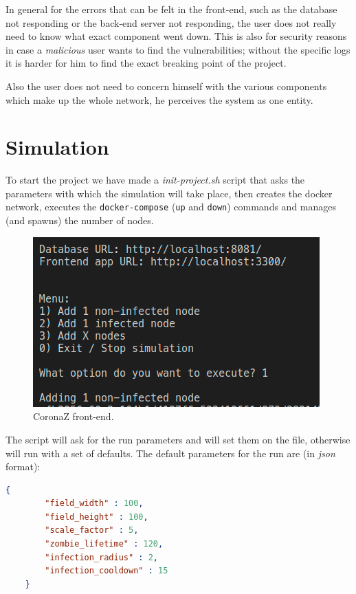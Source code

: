 \documentclass[conference]{IEEEtran}
\begin{document}
	In general for the errors that can be felt in the front-end, such as the database not responding or the back-end server not responding, the user does not really need to know what exact component went down.
	This is also for security reasons in case a \textit{malicious} user wants to find the vulnerabilities; without the specific logs it is harder for him to find the exact breaking point of the project.
	
	Also the user does not need to concern himself with the various components which make up the whole network, he perceives the system as one entity.
	
\section{Simulation}\label{sec:simulation}

	To start the project we have made a \textit{init-project.sh} script that asks the parameters with which the simulation will take place, then creates the docker network, executes the \texttt{docker-compose} (\texttt{up} and \texttt{down}) commands and manages (and spawns) the number of nodes.
	
	\begin{figure}[htbp]
		\centerline{\includegraphics[width=\linewidth]{img/script.png}}
		\caption{CoronaZ front-end.}
		\label{fig:frontend}
	\end{figure}

	The script will ask for the run parameters and will set them on the file, otherwise will run with a set of defaults.
	The default parameters for the run are (in \textit{json} format):
	\begin{lstlisting}[language=json]
    {
        "field_width" : 100,
        "field_height" : 100,
        "scale_factor" : 5,
        "zombie_lifetime" : 120,
        "infection_radius" : 2,
        "infection_cooldown" : 15
    }
	\end{lstlisting}
	
\end{document}
